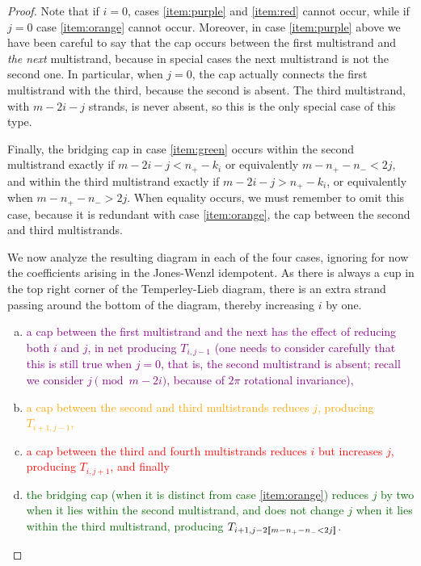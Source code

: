 \documentclass{article}
\begin{document}
\begin{proof}
Note that if $i=0$, cases \eqref{item:purple} and \eqref{item:red} cannot occur, while if $j=0$ case \eqref{item:orange} cannot occur. Moreover, in case \eqref{item:purple} above we have been careful to say that the cap occurs between the first multistrand and \emph{the next} multistrand, because in special cases the next multistrand is not the second one. In particular, when $j=0$, the cap actually connects the first multistrand with the third, because the second is absent. The third multistrand, with $m-2i-j$ strands, is never absent, so this is the only special case of this type.

Finally, the bridging cap in case \eqref{item:green} occurs within the second multistrand exactly if $m-2i-j < n_+ - k_i$ or equivalently $m-n_+-n_-< 2j$, and within the third multistrand exactly if $m-2i-j > n_+ - k_i$, or equivalently when $m-n_+-n_->2j$. When equality occurs, we must remember to omit this case, because it is redundant with case \eqref{item:orange}, the cap between the second and third multistrands.

We now analyze the resulting diagram in each of the four cases, ignoring for now the coefficients arising in the Jones-Wenzl idempotent. As there is always a cup in the top right corner of the Temperley-Lieb diagram, there is an extra strand passing around the bottom of the diagram, thereby increasing $i$ by one.
\begin{enumerate}[(a)]
\item
\textcolor{purple}{
a cap between the first multistrand and the next has the effect of reducing both $i$ and $j$, in net producing $T_{i,j-1}$ (one needs to consider carefully that this is still true when $j=0$, that is, the second multistrand is absent; recall we consider $j \pmod{m-2i}$, because of $2\pi$ rotational invariance),
}
\item
\textcolor{orange}{
a cap between the second and third multistrands reduces $j$, producing $T_{i+1, j-1}$, 
}
\item
\textcolor{red}{
a cap between the third and fourth multistrands reduces $i$ but increases $j$, producing $T_{i, j+1}$, and finally
}
\item
\textcolor{DarkGreen}{
the bridging cap (when it is distinct from case \eqref{item:orange}) reduces $j$ by two when it lies within the second multistrand, and does not change $j$ when it lies within the third multistrand, producing $T_{i+1, j - 2[\![ m-n_+-n_- < 2j ]\!]}$. 
}
\end{enumerate}


\end{proof}
\end{document}
